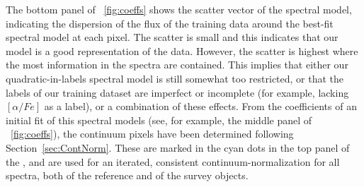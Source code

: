\documentclass[12pt, preprint]{aastex}
\newcommand{\sectionname}{Section}
\begin{document}
The bottom panel of \figurename~\ref{fig:coeffs} shows the scatter vector of the spectral model, 
indicating the dispersion of the flux of the training data around the best-fit spectral model at each pixel. 
The scatter is small and this indicates that our model is a good representation of the data. 
However, the scatter is highest where the most information in the spectra are contained. 
This implies that either our quadratic-in-labels spectral model is still somewhat too restricted, or that the labels of our training dataset are imperfect or incomplete 
(for example, lacking $[\alpha / Fe]$ as a label), or a combination of these effects. 
From the coefficients of an initial fit of this spectral models (see, for example, the middle panel of \figurename~\ref{fig:coeffs}), 
the continuum pixels have been determined following \sectionname~\ref{sec:ContNorm}. 
These are marked in the cyan dots in the top panel of the \figurename, and are used for an iterated, 
consistent continuum-normalization for all spectra, both of the reference and of the survey objects.
\end{document}

